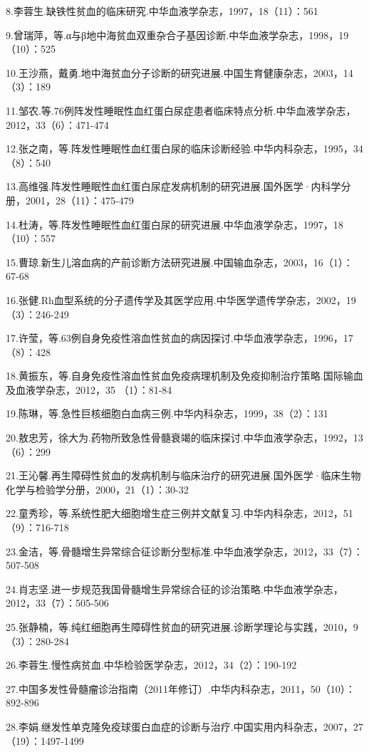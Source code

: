 8.李蓉生.缺铁性贫血的临床研究.中华血液学杂志，1997，18（11）：561

9.曾瑞萍，等.α与β地中海贫血双重杂合子基因诊断.中华血液学杂志，1998，19（10）：525

10.王沙燕，戴勇.地中海贫血分子诊断的研究进展.中国生育健康杂志，2003，14（3）：189

11.邹农.等.76例阵发性睡眠性血红蛋白尿症患者临床特点分析.中华血液学杂志，2012，33（6）：471-474

12.张之南，等.阵发性睡眠性血红蛋白尿的临床诊断经验.中华内科杂志，1995，34（8）：540

13.高维强.阵发性睡眠性血红蛋白尿症发病机制的研究进展.国外医学·内科学分册，2001，28（11）：475-479

14.杜涛，等.阵发性睡眠性血红蛋白尿的研究进展.中华血液学杂志，1997，18（10）：557

15.曹琼.新生儿溶血病的产前诊断方法研究进展.中国输血杂志，2003，16（1）：67-68

16.张健.Rh血型系统的分子遗传学及其医学应用.中华医学遗传学杂志，2002，19（3）：246-249

17.许莹，等.63例自身免疫性溶血性贫血的病因探讨.中华血液学杂志，1996，17（8）：428

18.黄振东，等.自身免疫性溶血性贫血免疫病理机制及免疫抑制治疗策略.国际输血及血液学杂志，2012，35
（1）：81-84

19.陈琳，等.急性巨核细胞白血病三例.中华内科杂志，1999，38（2）：131

20.敖忠芳，徐大为.药物所致急性骨髓衰竭的临床探讨.中华血液学杂志，1992，13（6）：299

21.王沁馨.再生障碍性贫血的发病机制与临床治疗的研究进展.国外医学·临床生物化学与检验学分册，2000，21（1）：30-32

22.童秀珍，等.系统性肥大细胞增生症三例并文献复习.中华内科杂志，2012，51（9）：716-718

23.金洁，等.骨髓增生异常综合征诊断分型标准.中华血液学杂志，2012，33（7）：507-508

24.肖志坚.进一步规范我国骨髓增生异常综合征的诊治策略.中华血液学杂志，2012，33（7）：505-506

25.张静楠，等.纯红细胞再生障碍性贫血的研究进展.诊断学理论与实践，2010，9（3）：280-284

26.李蓉生.慢性病贫血.中华检验医学杂志，2012，34（2）：190-192

27.中国多发性骨髓瘤诊治指南（2011年修订）.中华内科杂志，2011，50（10）：892-896

28.李娟.继发性单克隆免疫球蛋白血症的诊断与治疗.中国实用内科杂志，2007，27（19）：1497-1499

\protect\hypertarget{text00263.html}{}{}

